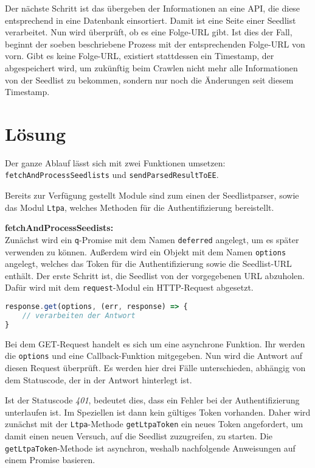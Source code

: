Der nächste Schritt ist das übergeben der Informationen an eine \acs{API}, die diese entsprechend in eine Datenbank einsortiert. Damit ist eine Seite einer Seedlist verarbeitet. Nun wird überprüft, ob es eine Folge-\ac{URL} gibt. Ist dies der Fall, beginnt der soeben beschriebene Prozess mit der entsprechenden Folge-URL von vorn. Gibt es keine Folge-\ac{URL}, existiert stattdessen ein Timestamp, der abgespeichert wird, um zukünftig beim Crawlen nicht mehr alle Informationen von der Seedlist zu bekommen, sondern nur noch die Änderungen seit diesem Timestamp.

\newpage


\section{Lösung}
\begin{sloppypar}
Der ganze Ablauf lässt sich mit zwei Funktionen umsetzen: \texttt{fetchAndProcessSeedlists} und \texttt{sendParsedResultToEE}.
\end{sloppypar}
Bereits zur Verfügung gestellt Module sind zum einen der Seedlistparser, sowie das Modul \texttt{Ltpa}, welches Methoden für die Authentifizierung bereistellt.

\textbf{fetchAndProcessSeedists:}\\
Zunächst wird ein \texttt{q}-Promise mit dem Namen \texttt{deferred} angelegt, um es später verwenden zu können. Außerdem wird ein Objekt mit dem Namen \texttt{options} angelegt, welches das Token für die Authentifizierung sowie die Seedlist-\ac{URL} enthält.
Der erste Schritt ist, die Seedlist von der vorgegebenen \ac{URL} abzuholen. Dafür wird mit dem \texttt{request}-Modul ein HTTP-Request abgesetzt.\\

\begin{lstlisting}[title=GET-Request, language=JavaScript]
response.get(options, (err, response) => {
	// verarbeiten der Antwort
}
\end{lstlisting} 

Bei dem GET-Request handelt es sich um eine asynchrone Funktion. Ihr werden die \texttt{options} und eine Callback-Funktion mitgegeben. Nun wird die Antwort auf diesen Request überprüft. Es werden hier drei Fälle unterschieden, abhängig von dem Statuscode, der in der Antwort hinterlegt ist.

Ist der Statuscode \textit{401}, bedeutet dies, dass ein Fehler bei der Authentifizierung unterlaufen ist. Im Speziellen ist dann kein gültiges Token vorhanden. Daher wird zunächst mit der \texttt{Ltpa}-Methode \texttt{getLtpaToken} ein neues Token angefordert, um damit einen neuen Versuch, auf die Seedlist zuzugreifen, zu starten. Die \texttt{getLtpaToken}-Methode ist asynchron, weshalb nachfolgende Anweisungen auf einem Promise basieren. \\

